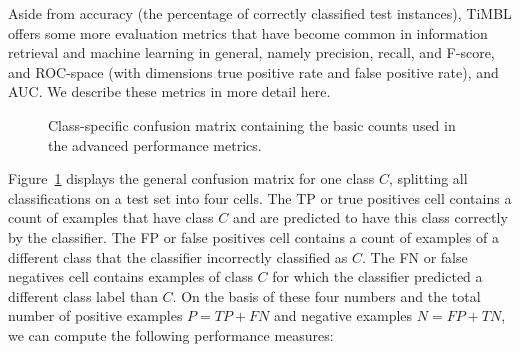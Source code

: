 \documentclass{report}
\begin{document}
Aside from accuracy (the percentage of correctly classified test instances), TiMBL offers some more evaluation metrics that have become common in information retrieval and machine learning in general, namely precision, recall, and F-score, and ROC-space (with dimensions true positive rate and false positive rate), and AUC. We describe these metrics in more detail here.

\begin{figure}
\begin{center}
\vspace*{-0.5cm}
\end{center}
\caption{Class-specific confusion matrix containing the basic counts
  used in the advanced performance metrics. \label{confmat}}
\end{figure}

Figure~\ref{confmat} displays the general confusion matrix for one class $C$, splitting all classifications on a test set into four cells. The TP or true positives cell contains a count of examples that have class $C$ and are predicted to have this class correctly by the classifier. The FP or false positives cell contains a count of examples of a different class that the classifier incorrectly classified as $C$. The FN or false negatives cell contains examples of class $C$ for which the classifier predicted a different class label than $C$.  On the basis of these four numbers and the total number of positive examples $P=TP+FN$ and negative examples $N=FP+TN$, we can compute the following performance measures:
\end{document}

